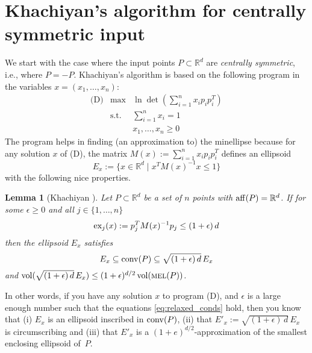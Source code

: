 \documentclass[a4paper,twocolumn]{article}
\newcommand{\R}{\ensuremath{\mathbb{R}}}
\newcommand{\vol}{\ensuremath{\mathop{\rm vol}\nolimits}}
\newcommand{\aff}{\ensuremath{\mathop{\rm aff}\nolimits}}
\newcommand{\conv}{\ensuremath{\mathop{\rm conv}\nolimits}}
\newcommand{\excess}{\ensuremath{\mathop{\rm ex}\nolimits}}
\newcommand{\MEL}{\ensuremath{\mathop{\textnormal{\textsc{mel}}}\nolimits}}
\newtheorem{lemma}[theorem]{Lemma}
\begin{document}
\section{Khachiyan's algorithm for centrally symmetric input}
\label{sec:khachiyan}

We start with the case where the input points $P\subset \R^d$ are
\emph{centrally symmetric}, i.e., where $P=-P$.  Khachiyan's algorithm
is based on the following program in the variables
$x=(x_1,\ldots,x_n)$:
\begin{equation}
  \label{eq:dual}
  \begin{array}{lll}
    \mbox{(D)} & \mbox{max}  & \ln \det(\sum_{i=1}^n x_i p_i p_i^T) \\
    & \mbox{s.t.} & \sum_{i=1}^n x_i = 1 \\
    &             & x_1,\ldots,x_n \ge 0
  \end{array}
\end{equation}
The program helps in finding (an approximation to) the minellipse
because for any solution $x$ of (D), the matrix $M(x):= \sum_{i=1}^n
x_i p_i p_i^T$ defines an ellipsoid
\begin{equation}
  \label{eq:sol_ell}
  E_x:= \{ x \in \R^d \mid x^T M(x)^{-1} x \le 1 \}
\end{equation}
with the following nice properties.

\begin{lemma}[Khachiyan \cite{k-rprnmc-96}]
  \label{thm:rounding}
  Let $P\subset\R^d$ be a set of $n$ points with $\aff(P)=\R^d$.  If
  for some $\epsilon\ge 0$ and all $j\in\{1,\ldots,n\}$
  \begin{equation}
    \label{eq:relaxed_conds}
    \excess_j(x):= p_j^T M(x)^{-1} p_j \le (1+\epsilon)\,d
  \end{equation}
  then the ellipsoid $E_x$ satisfies 
  \begin{equation}
    \label{eq:rounding}
    E_x \subseteq \conv(P) \subseteq \sqrt{(1+\epsilon)\,d}\,E_x
  \end{equation}
  and $\vol(\sqrt{(1+\epsilon)\,d}\,E_x) \le (1+\epsilon)^{d/2}
  \vol(\MEL(P))$.
\end{lemma}
%
In other words, if you have any solution $x$ to program (D), and
$\epsilon$ is a large enough number such that the equations
\eqref{eq:relaxed_conds} hold, then you know that (i) $E_x$ is an
ellipsoid inscribed in $\conv(P)$, (ii) that $E'_x:=
\sqrt{(1+\epsilon)\,d}\,E_x$ is circumscribing and (iii) that $E'_x$
is a $(1+e)^{d/2}$-approximation of the smallest enclosing ellipsoid
of~$P$.
\end{document}
